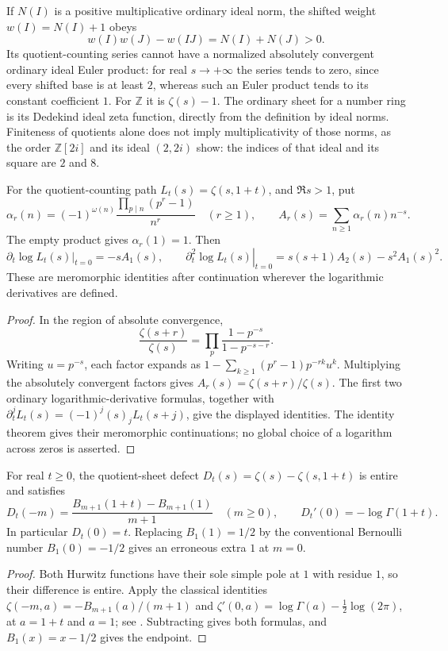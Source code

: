 If $N(I)$ is a positive multiplicative ordinary ideal norm, the shifted
weight $w(I)=N(I)+1$ obeys
\[
 w(I)w(J)-w(IJ)=N(I)+N(J)>0.
\]
Its quotient-counting series cannot have a normalized absolutely
convergent ordinary ideal Euler product: for real $s\to+\infty$ the
series tends to zero, since every shifted base is at least $2$, whereas
such an Euler product tends to its constant coefficient $1$. For
$\mathbb Z$ it is $\zeta(s)-1$. The ordinary sheet for a number ring is
its Dedekind ideal zeta function, directly from the definition by ideal
norms. Finiteness of quotients alone does not imply multiplicativity of
those norms, as the order $\mathbb Z[2i]$ and its ideal $(2,2i)$ show:
the indices of that ideal and its square are $2$ and $8$.

\begin{proposition}\label{prop:quotient-log-jets}
For the quotient-counting path $L_t(s)=\zeta(s,1+t)$, and $\Re s>1$, put
\[
 \alpha_r(n)=(-1)^{\omega(n)}
       \frac{\prod_{p\mid n}(p^r-1)}{n^r}\quad(r\ge1),
 \qquad A_r(s)=\sum_{n\ge1}\alpha_r(n)n^{-s}.
\]
The empty product gives $\alpha_r(1)=1$. Then
\[
 \left.\partial_t\log L_t(s)\right|_{t=0}=-sA_1(s),
 \qquad
 \left.\partial_t^2\log L_t(s)\right|_{t=0}
       =s(s+1)A_2(s)-s^2A_1(s)^2.
\]
These are meromorphic identities after continuation wherever the
logarithmic derivatives are defined.
\end{proposition}
\begin{proof}
In the region of absolute convergence,
\[
 \frac{\zeta(s+r)}{\zeta(s)}
 =\prod_p\frac{1-p^{-s}}{1-p^{-s-r}}.
\]
Writing $u=p^{-s}$, each factor expands as
$1-\sum_{k\ge1}(p^r-1)p^{-rk}u^k$. Multiplying the absolutely convergent
factors gives $A_r(s)=\zeta(s+r)/\zeta(s)$. The first two ordinary
logarithmic-derivative formulas, together with
$\partial_t^jL_t(s)=(-1)^j(s)_jL_t(s+j)$, give the displayed identities.
The identity theorem gives their meromorphic continuations; no global
choice of a logarithm across zeros is asserted.
\end{proof}

\begin{proposition}
\label{prop:bernoulli-endpoint}
For real $t\ge0$, the quotient-sheet defect
$D_t(s)=\zeta(s)-\zeta(s,1+t)$ is entire and satisfies
\[
 D_t(-m)=\frac{B_{m+1}(1+t)-B_{m+1}(1)}{m+1}\quad(m\ge0),
 \qquad D_t'(0)=-\log\Gamma(1+t).
\]
In particular $D_t(0)=t$. Replacing $B_1(1)=1/2$ by the conventional
Bernoulli number $B_1(0)=-1/2$ gives an erroneous extra $1$ at $m=0$.
\end{proposition}
\begin{proof}
Both Hurwitz functions have their sole simple pole at $1$ with residue
$1$, so their difference is entire. Apply the classical identities
$\zeta(-m,a)=-B_{m+1}(a)/(m+1)$ and
$\zeta'(0,a)=\log\Gamma(a)-\tfrac12\log(2\pi)$, at $a=1+t$ and $a=1$;
see \citet[\S25.11(i), equations 25.11.14 and 25.11.18]{DLMFShift}.
Subtracting gives both formulas, and $B_1(x)=x-1/2$ gives the endpoint.
\end{proof}
